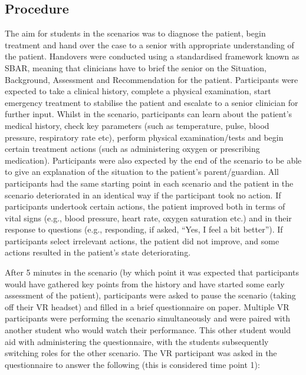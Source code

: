 \documentclass[a4paper, nobind]{templates/ociamthesis}
\begin{document}
\subsection{Procedure}\label{procedure}

The aim for students in the scenarios was to diagnose the patient, begin treatment and hand over the case to a senior with appropriate understanding of the patient. Handovers were conducted using a standardised framework known as SBAR, meaning that clinicians have to brief the senior on the Situation, Background, Assessment and Recommendation for the patient. Participants were expected to take a clinical history, complete a physical examination, start emergency treatment to stabilise the patient and escalate to a senior clinician for further input. Whilst in the scenario, participants can learn about the patient's medical history, check key parameters (such as temperature, pulse, blood pressure, respiratory rate etc), perform physical examination/tests and begin certain treatment actions (such as administering oxygen or prescribing medication). Participants were also expected by the end of the scenario to be able to give an explanation of the situation to the patient's parent/guardian. All participants had the same starting point in each scenario and the patient in the scenario deteriorated in an identical way if the participant took no action. If participants undertook certain actions, the patient improved both in terms of vital signs (e.g., blood pressure, heart rate, oxygen saturation etc.) and in their response to questions (e.g., responding, if asked, ``Yes, I feel a bit better''). If participants select irrelevant actions, the patient did not improve, and some actions resulted in the patient's state deteriorating.

\hfill\break
After 5 minutes in the scenario (by which point it was expected that participants would have gathered key points from the history and have started some early assessment of the patient), participants were asked to pause the scenario (taking off their VR headset) and filled in a brief questionnaire on paper. Multiple VR participants were performing the scenario simultaneously and were paired with another student who would watch their performance. This other student would aid with administering the questionnaire, with the students subsequently switching roles for the other scenario. The VR participant was asked in the questionnaire to answer the following (this is considered time point 1):
\end{document}
